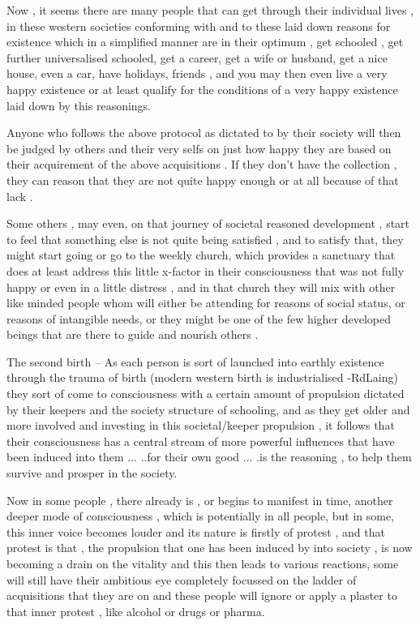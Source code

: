 \begin{footnotesize}
\begin{sffamily}
Now , it seems there are many people that can get through their individual lives , in these western societies conforming with and to these laid down reasons for existence which in a simplified manner are in their optimum , get schooled , get further universalised schooled, get a career, get a wife or husband, get a nice house, even a car, have holidays, friends , and you may then even live a very happy existence or at least qualify for the conditions of a very happy existence laid down by this reasonings.

Anyone who follows the above protocol as dictated to by their society will then be judged by others and their very selfs on just how happy they are based on their acquirement of the above acquisitions . If they don't have the collection , they can reason that they are not quite happy enough or at all because of that lack .

Some others , may even, on that journey of societal reasoned development , start to feel that something else is not quite being satisfied , and to satisfy that, they might start going or go to the weekly church, which provides a sanctuary that does at least address this little x-factor in their consciousness that was not fully happy or even in a little distress , and in that church they will mix with other like minded people whom will either be attending for reasons of social status, or reasons of intangible needs, or they might be one of the few higher developed beings that are there to guide and nourish others .

The second birth -- As each person is sort of launched into earthly existence through the trauma of birth (modern western birth is industrialised -RdLaing) they sort of come to consciousness with a certain amount of propulsion dictated by their keepers and the society structure of schooling, and as they get older and more involved and investing in this societal/keeper propulsion , it follows that their consciousness has a central stream of more powerful influences that have been induced into them ... ..for their own good ... .is the reasoning , to help them survive and prosper in the society.

Now in some people , there already is , or begins to manifest in time, another deeper mode of consciousness , which is potentially in all people, but in some, this inner voice becomes louder and its nature is firstly of protest , and that protest is that , the propulsion that one has been induced by into society , is now becoming a drain on the vitality and this then leads to various reactions, some will still have their ambitious eye completely focussed on the ladder of acquisitions that they are on and these people will ignore or apply a plaster to that inner protest , like alcohol or drugs or pharma.


\end{sffamily}
\end{footnotesize}
